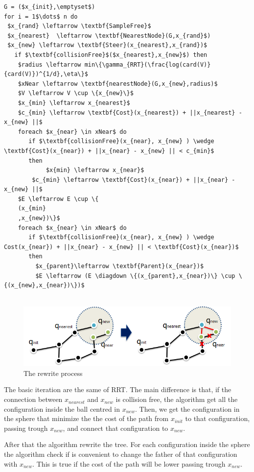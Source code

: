 \documentclass[10pt]{article}
\begin{document}
		\begin{lstlisting}[frame=single, mathescape=true,caption={RRT*}]
G = ($x_{init},\emptyset$)
for i = 1$\dots$ n do
 $x_{rand} \leftarrow \textbf{SampleFree}$
 $x_{nearest}  \leftarrow \textbf{NearestNode}(G,x_{rand}$)
 $x_{new} \leftarrow \textbf{Steer}(x_{nearest},x_{rand})$	
   if $\textbf{collisionFree}$($x_{nearest},x_{new}$) then
	$radius \leftarrow min\{\gamma_{RRT}(\frac{log(card(V)}{card(V)})^{1/d},\eta\}$
	$xNear \leftarrow \textbf{nearestNode}(G,x_{new},radius)$
	$V \leftarrow V \cup \{x_{new}\}$
	$x_{min} \leftarrow x_{nearest}$
	$c_{min} \leftarrow \textbf{Cost}(x_{nearest}) + ||x_{nearest} - x_{new} ||$
	foreach $x_{near} \in xNear$ do
	   if $\textbf{collisionFree}(x_{near}, x_{new} ) \wedge \textbf{Cost}(x_{near}) + ||x_{near} - x_{new} || < c_{min}$
	   then
	        $x{min} \leftarrow x_{near}$
		$c_{min} \leftarrow \textbf{Cost}(x_{near}) + ||x_{near} - x_{new} ||$
	$E \leftarrow E \cup \{
	(x_{min}
	,x_{new})\}$
	foreach $x_{near} \in xNear$ do
	   if $\textbf{collisionFree}(x_{near}, x_{new} ) \wedge Cost(x_{near}) + ||x_{near} - x_{new} || < \textbf{Cost}(x_{near})$
	   then
	     $x_{parent}\leftarrow \textbf{Parent}(x_{near})$
	     $E \leftarrow (E \diagdown \{(x_{parent},x_{near})\} \cup \{(x_{new},x_{near})\})$
	
	\end{lstlisting}
	\FloatBarrier
	\begin{figure}
		\centering
		\includegraphics[width=\linewidth]{rrtRew.png}
		\caption{The rewrite process}
	\end{figure}
	\FloatBarrier
	The basic iteration are the same of RRT. The main difference is that, if the connection between $x_{nearest}$ and $x_{new}$ is collision free, the algorithm get all the configuration inside the ball centred in $x_{new}$. Then, we get the configuration in the sphere that minimize the the cost of the path from $x_{init}$ to that configuration, passing trough $x_{new}$, and connect that configuration to $x_{new}$.
	
	After that the algorithm rewrite the tree. For each configuration inside the sphere the algorithm check if is convenient to change the father of that configuration with $x_{new}$. This is true if the cost of the path will be lower passing trough $x_{new}$.
	
\end{document}
